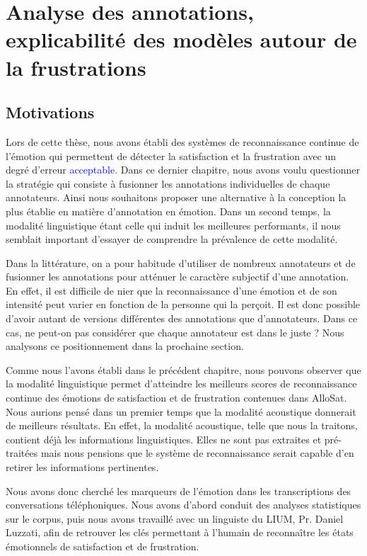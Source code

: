 \chapter{Analyse des annotations, explicabilité des modèles autour de la frustrations}
\label{chapitre7}

\section{Motivations}
Lors de cette thèse, nous avons établi des systèmes de reconnaissance continue de l'émotion qui permettent de détecter la satisfaction et la frustration avec un degré d'erreur \textcolor{blue}{acceptable}.
Dans ce dernier chapitre, nous avons voulu questionner la stratégie qui consiste à fusionner les annotations individuelles de chaque annotateurs.
Ainsi nous souhaitons proposer une alternative à la conception la plus établie en matière d'annotation en émotion.
Dans un second temps, la modalité linguistique étant celle qui induit les meilleures performants, il nous semblait important d'essayer de comprendre la prévalence de cette modalité.

Dans la littérature, on a pour habitude d'utiliser de nombreux annotateurs et de fusionner les annotations pour atténuer le caractère subjectif d'une annotation. En effet, il est difficile de nier que la reconnaissance d'une émotion et de son intensité peut varier en fonction de la personne qui la perçoit. Il est donc possible d'avoir autant de versions différentes des annotations que d'annotateurs. Dans ce cas, ne peut-on pas considérer que chaque annotateur est dans le juste ? Nous analysons ce positionnement dans la prochaine section.

Comme nous l'avons établi dans le précédent chapitre, nous pouvons observer que la modalité linguistique permet d'atteindre les meilleurs scores de reconnaissance continue des émotions de satisfaction et de frustration contenues dans AlloSat. Nous aurions pensé dans un premier temps que la modalité acoustique donnerait de meilleurs résultats. En effet, la modalité acoustique, telle que nous la traitons, contient déjà les informations linguistiques. Elles ne sont pas extraites et pré-traitées mais nous pensions que le système de reconnaissance serait capable d'en retirer les informations pertinentes.

Nous avons donc cherché les marqueurs de l'émotion dans les transcriptions des conversations téléphoniques. Nous avons d'abord conduit des analyses statistiques sur le corpus, puis nous avons travaillé avec un linguiste du LIUM, Pr. Daniel Luzzati, afin de retrouver les clés permettant à l'humain de reconnaître les états émotionnels de satisfaction et de frustration.

